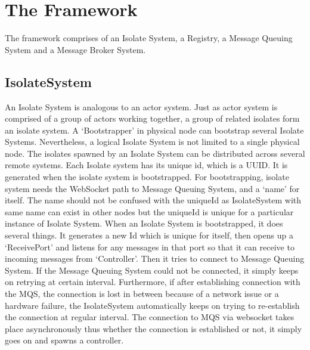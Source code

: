 \section{The Framework}
The framework comprises of an Isolate System, a Registry, a Message Queuing System and a Message Broker System.
  \subsection{IsolateSystem}
  An Isolate System is analogous to an actor system. Just as actor system is comprised of a group of actors working together, a group of related isolates form an isolate system. A ‘Bootstrapper’ in physical node can bootstrap several Isolate Systems. Nevertheless, a logical Isolate System is not limited to a single physical node. The isolates spawned by an Isolate System can be distributed across several remote systems.
  Each Isolate system has its unique id, which is a UUID. It is generated when the isolate system is bootstrapped. For bootstrapping, isolate system needs the WebSocket path to Message Queuing System, and a ‘name’ for itself. The name should not be confused with the uniqueId as IsolateSystem with same name can exist in other nodes but the uniqueId is unique for a particular instance of Isolate System.
  When an Isolate System is bootstrapped, it does several things. It generates a new Id which is unique for itself, then opens up a ‘ReceivePort’ and listens for any messages in that port so that it can receive to incoming messages from ‘Controller’. Then it tries to connect to Message Queuing System. If the Message Queuing System could not be connected, it simply keeps on retrying at certain interval. Furthermore, if after establishing connection with the MQS, the connection is lost in between because of a network issue or a hardware failure, the IsolateSystem automatically keeps on trying to re-establish the connection at regular interval. The connection to MQS via websocket takes place asynchronously thus whether the connection is established or not, it simply goes on and spawns a controller.

